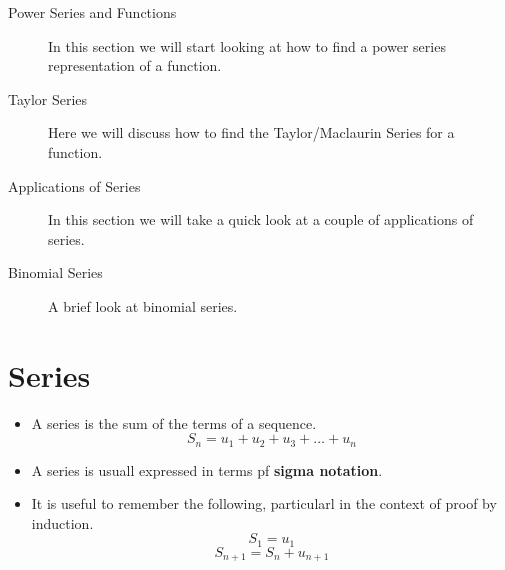 \documentclass[]{report}
\begin{document}
	
\begin{description}	
\item[Power Series and Functions]  In this section we will start looking at how to find a power series representation of a function.
 
\item[Taylor Series]  Here we will discuss how to find the Taylor/Maclaurin Series for a function.
 
\item[Applications of Series]  In this section we will take a quick look at a couple of applications of series.
 
\item[Binomial Series]  A brief look at binomial series.
\end{description}



\newpage

\section{Series}



\begin{itemize}
\item A series is the sum of the terms of a sequence. 
\[ S_n = u_1 + u_2 + u_3+ \ldots +u_n\]
\item A series is usuall expressed in terms pf \textbf{sigma notation}.
\item It is useful to remember the following, particularl in the context of proof by induction.
\[S_1 = u_1\]
\[S_{n+1} = S_n + u_{n+1}\]

\end{itemize}
\end{document}
